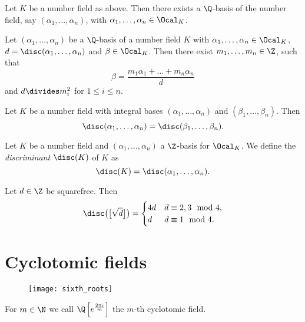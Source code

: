 
\begin{lem}
	Let \( K \) be a number field as above.
	Then there exists a \( \Q \)-basis of the number field, say \( (\alpha_1, \dotsc, \alpha_n) \), with \( \alpha_1, \dotsc, \alpha_n \in \Ocal_K \).
\end{lem}

\begin{prop}\label{thm:1.22}
	Let \( (\alpha_1, \dotsc, \alpha_n) \) be a \( \Q \)-basis of a number field \( K \) with \( \alpha_1, \dotsc, \alpha_n \in \Ocal_K \), \( d = \disc(\alpha_1, \dotsc, \alpha_n) \) and \( \beta \in \Ocal_K \).
	Then there exist \( m_1, \dotsc, m_n \in \Z \), such that
	\[ \beta = \frac{m_1\alpha_1 + \dots + m_n\alpha_n}{d} \]
	and \( d \divides m_i^2 \) for \( 1 \leq i \leq n \).
\end{prop}

\begin{lem}
	Let \( K \) be a number field with integral bases \( (\alpha_1, \dotsc, \alpha_n) \) and \( (\beta_1, \dotsc, \beta_n) \).
	Then
	\[ \disc(\alpha_1, \dotsc, \alpha_n) = \disc(\beta_1, \dotsc, \beta_n). \]
\end{lem}

\begin{defn*}[Discriminant of \( K \)]
	Let \( K \) be a number field and \( (\alpha_1, \dotsc, \alpha_n) \) a \( \Z \)-basis for \( \Ocal_K \).
	We define the \emph{discriminant} \( \disc(K) \) of \( K \) as
	\[ \disc(K) = \disc(\alpha_1, \dotsc, \alpha_n). \]
\end{defn*}

\begin{exmp*}
	Let \( d \in \Z \) be squarefree. Then
	\[ \disc\big(\big[\sqrt{d}\big]\big) = \begin{cases}
		4d &d \equiv 2,3 \mod 4,\\
		d &d \equiv 1 \mod 4.
	\end{cases} \]
\end{exmp*}


\section{Cyclotomic fields}

\begin{wrapfigure}{R}{2cm}
	\texttt{[image: sixth\_roots]}
\end{wrapfigure}

\begin{defn*}
	For \( m \in \N \) we call \( \Q \left[ e^\frac{2\pi i}{m} \right] \) the \( m \)-th cyclotomic field.
\end{defn*}


